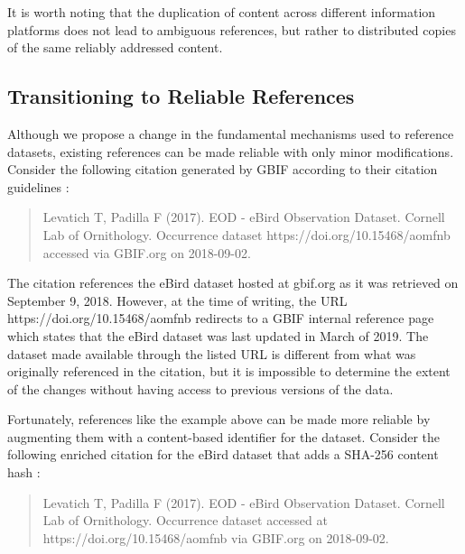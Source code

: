 It is worth noting that the duplication of content across different information platforms does not lead to ambiguous references, but rather to distributed copies of the same reliably addressed content.

% 

\subsection*{Transitioning to Reliable References}
Although we propose a change in the fundamental mechanisms used to reference datasets, existing references can be made reliable with only minor modifications. Consider the following citation generated by GBIF according to their citation guidelines :

\begin{quote}
Levatich T, Padilla F (2017). EOD - eBird Observation Dataset. Cornell Lab of Ornithology. Occurrence dataset https://doi.org/10.15468/aomfnb accessed via GBIF.org on 2018-09-02.
\end{quote}

The citation references the eBird dataset hosted at gbif.org as it was retrieved on September 9, 2018. However, at the time of writing, the URL https://doi.org/10.15468/aomfnb redirects to a GBIF internal reference page which states that the eBird dataset was last updated in March of 2019. The dataset made available through the listed URL is different from what was originally referenced in the citation, but it is impossible to determine the extent of the changes without having access to previous versions of the data.

Fortunately, references like the example above can be made more reliable by augmenting them with a content-based identifier for the dataset. Consider the following enriched citation for the eBird dataset that adds a SHA-256 content hash :

\begin{quote}
Levatich T, Padilla F (2017). EOD - eBird Observation Dataset. Cornell Lab of Ornithology. Occurrence dataset  accessed at https://doi.org/10.15468/aomfnb via GBIF.org on 2018-09-02.
\end{quote}


